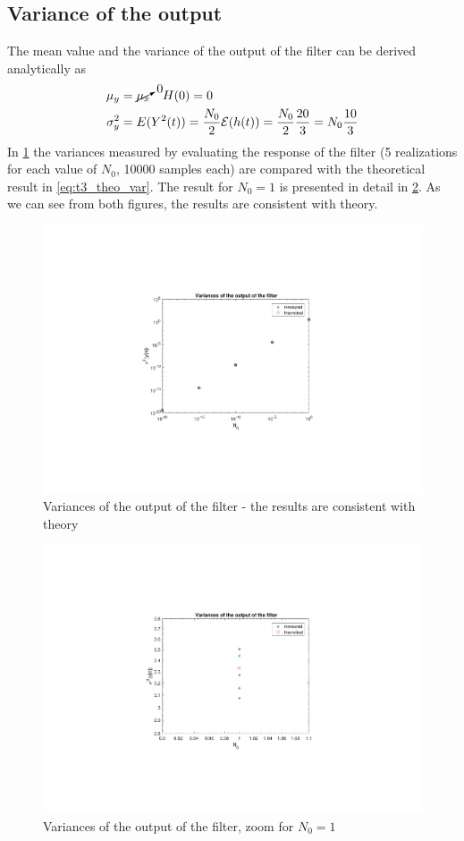 \subsection{Variance of the output}
The mean value and the variance of the output of the filter can be derived analytically as
\begin{align}
\mu_y&=\cancelto{0}{\mu_x} \quad  H(0)=0\nonumber\\
\sigma^2_y&=E(Y^2(t))=\frac{N_0}{2} \mathcal{E} (h(t))=\frac{N_0}{2}\frac{20}{3}=N_0 \frac{10}{3} \label{eq:t3_theo_var}
\end{align}
In \cref{fig:t3_variances} the variances measured by evaluating the response of the filter (5 realizations for each value of $N_0$, 10000 samples each) are compared with the theoretical result in \cref{eq:t3_theo_var}. The result for $N_0=1$ is presented in detail in \cref{fig:t3_variances_zoom}. As we can see from both figures, the results are consistent with theory.
\begin{figure}[H]
	\centering
	\includegraphics[trim={7.8cm 4.8cm 8cm 5cm}, clip, width=0.8\linewidth]{variances}
	\caption{Variances of the output of the filter - the results are consistent with theory}
	\label{fig:t3_variances}
\end{figure}
\begin{figure}[H]
\centering
\includegraphics[trim={7.8cm 4.8cm 8cm 5cm}, clip, width=0.8\linewidth]{variances_zoom}
\caption{Variances of the output of the filter, zoom for $N_0=1$}
\label{fig:t3_variances_zoom}
\end{figure}
